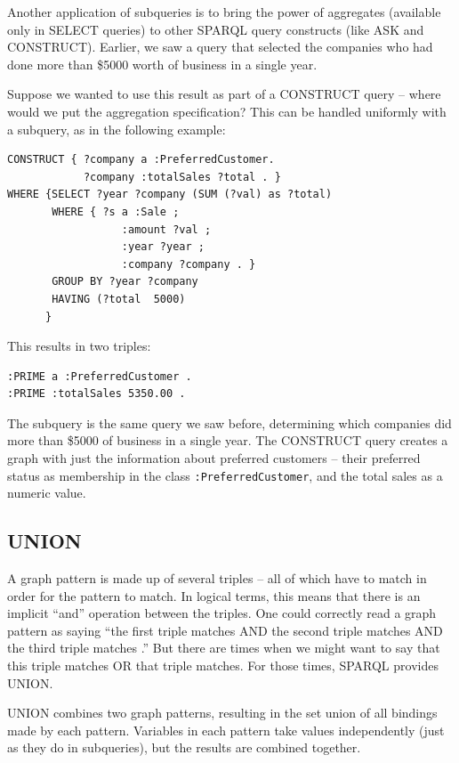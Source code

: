 Another application of subqueries is to bring the power of aggregates
(available only in SELECT queries) to other SPARQL query constructs
(like ASK and CONSTRUCT). Earlier, we saw a query that selected the
companies who had done more than \$5000 worth of business in a single
year.

Suppose we wanted to use this result as part of a CONSTRUCT query --
where would we put the aggregation specification? This can be handled
uniformly with a subquery, as in the following example:

\begin{lstlisting}
CONSTRUCT { ?company a :PreferredCustomer.
            ?company :totalSales ?total . }
WHERE {SELECT ?year ?company (SUM (?val) as ?total)
       WHERE { ?s a :Sale ;
                  :amount ?val ;
                  :year ?year ;
                  :company ?company . }
       GROUP BY ?year ?company 
       HAVING (?total  5000)
      }
\end{lstlisting}


This results in two triples:

\begin{lstlisting}
:PRIME a :PreferredCustomer . 
:PRIME :totalSales 5350.00 .
\end{lstlisting}


The subquery is the same query we saw before, determining which
companies did more than \$5000 of business in a single year. The
CONSTRUCT query creates a graph with just the information about
preferred customers -- their preferred status as membership in the class
\texttt{:PreferredCustomer}, and the total sales as a numeric value.

\subsection{UNION}

A graph pattern is made up of several triples -- all of which have to
match in order for the pattern to match. In logical terms, this means
that there is an implicit ``and'' operation between the triples. One
could correctly read a graph pattern as saying ``the first triple
matches AND the second triple matches AND the third triple matches .''
But there are times when we might want to say that this triple matches
OR that triple matches. For those times, SPARQL provides UNION.

UNION combines two graph patterns, resulting in the set union of all
bindings made by each pattern. Variables in each pattern take values
independently (just as they do in subqueries), but the results are
combined together.

